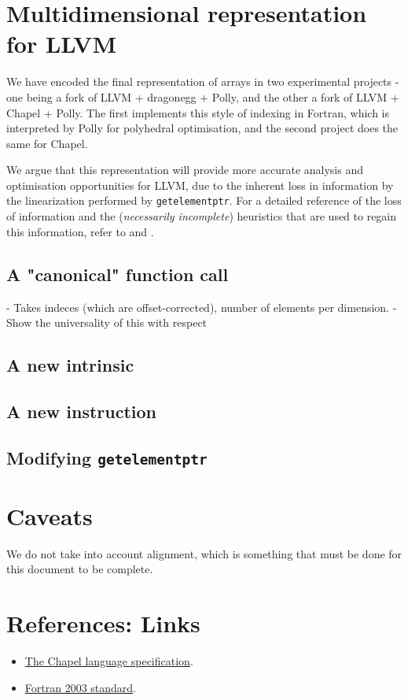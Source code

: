 \documentclass{article}
\newcommand{\gep}{\texttt{getelementptr}}
\begin{document}
\section{Multidimensional representation for LLVM}
We have encoded the final representation of arrays in two experimental projects -
one being a fork of LLVM + dragonegg + Polly, and the other a fork of
LLVM + Chapel + Polly. The first implements this style of indexing in Fortran,
which is interpreted by Polly for polyhedral optimisation, and the second
project does the same for Chapel.

We argue that this representation will provide more accurate analysis and
optimisation opportunities for LLVM, due to the inherent loss in information
by the linearization performed by \gep. For a detailed reference of 
the loss of information and the (\textit{necessarily incomplete}) heuristics
that are used to regain this information, refer to \cite{grosser2015optimistic}
and \cite{maslov1992delinearization}.

\subsection{A "canonical" function call}
- Takes indeces (which are offset-corrected), number of elements per dimension.
- Show the universality of this with respect
\subsection{A new intrinsic}
\subsection{A new instruction}
\subsection{Modifying \gep}

\section{Caveats}
We do not take into account alignment, which is something that must be done
for this document to be complete.

\section{References: Links}

\begin{itemize}
    \item \href{https://chapel-lang.org/docs/1.13/_downloads/chapelLanguageSpec.pdf}{The Chapel language specification}.
    \item \href{http://www.j3-fortran.org/doc/year/04/04-007.pdf}{Fortran 2003 standard}.
\end{itemize}


\end{document}
